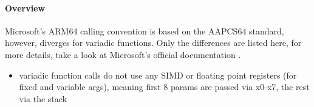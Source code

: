 \paragraph{Overview}

Microsoft's ARM64 calling convention is based on the AAPCS64 standard, however, diverges for variadic functions.
Only the differences are listed here, for more details, take a look at Microsoft's official documentation \cite{MicrosoftARM64}.

\begin{itemize}
\item variadic function calls do not use any SIMD or floating point registers (for fixed and variable args), meaning first 8 params are passed via x0-x7, the rest via the stack
\end{itemize}

